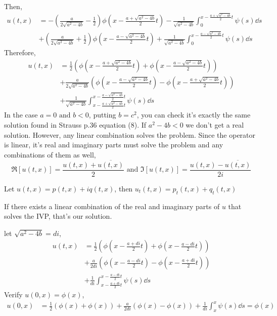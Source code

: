 \documentclass{article}
\begin{document}
Then,
\begin{align*}
  u(t,x)
  &= -\left(\frac{a}{2\sqrt{a^2-4b}}
    -\frac{1}{2}\right)\phi\left(x - \frac{a+\sqrt{a^2-4b}}{2}t \right)
    -\frac{1}{\sqrt{a^2-4b}}\int_0^{x - \frac{a+\sqrt{a^2-4b}}{2}t }\psi(s)\dd{s}\\
  &+\left(\frac{a}{2\sqrt{a^2-4b}}
    + \frac{1}{2}\right)\phi\left(x -\frac{a-\sqrt{a^2-4b}}{2}t \right)
    +\frac{1}{\sqrt{a^2-4b}}\int_0^{x - \frac{a-\sqrt{a^2-4b}}{2}t
    }\psi(s)\dd{s}
\end{align*}
Therefore,
\begin{align*}
  u(t,x)
  &= \frac{1}{2}\left( \phi\left(x - \frac{a+\sqrt{a^2-4b}}{2}t
    \right) + \phi\left(x -\frac{a-\sqrt{a^2-4b}}{2}t \right)\right)\\
  &+\frac{a}{2\sqrt{a^2-4b}}\left(\phi\left(x
    -\frac{a-\sqrt{a^2-4b}}{2}t \right) - \phi\left(x
    -\frac{a+\sqrt{a^2-4b}}{2}t \right)  \right)\\
  &+\frac{1}{\sqrt{a^2-4b}}\int_{x - \frac{a+\sqrt{a^2-4b}}{2}t }^{x - \frac{a-\sqrt{a^2-4b}}{2}t }\psi(s)\dd{s}
\end{align*}
In the case $a= 0 \text{ and }b < 0$,  putting
$b= c^2$, you can check it's exactly the same solution found in Strauss p.36 equation (8).
\newpage
If $a^2-4b < 0$ we don't get a real solution. However, any linear
combination solves the problem. Since the operator is linear, it's
real and imaginary parts must solve the problem and any combinations
of them as well,
\[\Re [u(t,x)] = \frac{u(t,x)+\overline{u(t,x)}}{2} \text{ and } \Im[
  u(t,x)] =  \frac{u(t,x)-\overline{u(t,x)}}{2i}\]

Let $u(t,x) = p(t,x) +iq(t,x)$, then $u_t(t,x) = p_t(t,x)+q_t(t,x)$

If there exists a linear combination of the real
and imaginary parts of $u$ that solves the IVP, that's our solution.

let $\sqrt{a^2-4b} = di$,
\begin{align*}
    u(t,x)
  &= \frac{1}{2}\left( \phi\left(x - \frac{a+di}{2}t
    \right) + \phi\left(x -\frac{a-di}{2}t \right)\right)\\
  &+\frac{a}{2di}\left(\phi\left(x
    -\frac{a-di}{2}t \right) - \phi\left(x
    -\frac{a+di}{2}t \right)  \right)\\
  &+\frac{1}{di}\int_{x - \frac{a+di}{2}t }^{x - \frac{a-di}{2}t }\psi(s)\dd{s}
\end{align*}
Verify $u(0,x) = \phi(x)$,
\begin{align*}
    u(0,x)
  &= \frac{1}{2}\left( \phi\left(x
    \right) + \phi\left(x \right)\right)
  +\frac{a}{2di}\left(\phi\left(x
    \right) - \phi\left(x
    \right)  \right)
  +\frac{1}{di}\int_{x }^{x }\psi(s)\dd{s} = \phi(x)
\end{align*}
\end{document}
